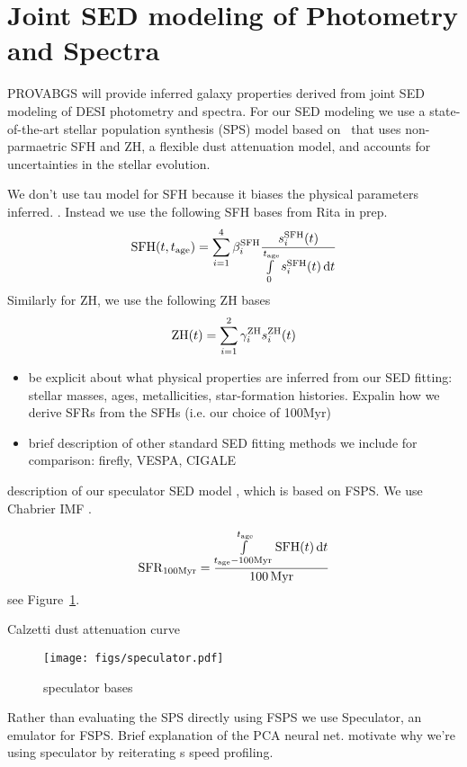 \section{Joint SED modeling of Photometry and Spectra} \label{sec:methods}
PROVABGS will provide inferred galaxy properties derived from joint SED
modeling of DESI photometry and spectra. 
For our SED modeling we use a state-of-the-art stellar population synthesis
(SPS) model based on \fsps~that uses non-parmaetric SFH and ZH, a flexible dust
attenuation model, and accounts for uncertainties in the stellar evolution. 

We don't use tau model for SFH because it biases the physical parameters
inferred. . Instead we use the
following SFH bases from Rita in prep. 
\begin{equation}
    {\rm SFH}(t, t_{\rm age}) = \sum\limits_{i=1}^{4} \beta_i^{\rm SFH}
    \frac{s_i^{\rm SFH}(t)}{\int\limits_0^{t_{\rm age}} s_i^{\rm SFH}(t) \,
    {\rm d}t}
\end{equation} 
Similarly for ZH, we use the following ZH bases 
\begin{equation}
    {\rm ZH}(t) = \sum\limits_{i=1}^2 \gamma_i^{\rm ZH} s_i^{\rm ZH}(t)
\end{equation} 



\begin{itemize}
    \item be explicit about what physical properties are inferred from our SED
        fitting: stellar masses, ages, metallicities, star-formation histories.
        Expalin how we derive SFRs from the SFHs (i.e. our choice of 100Myr) 
    \item brief description of other standard SED fitting methods we include for
        comparison: firefly, VESPA, CIGALE
\end{itemize} 


description of our speculator SED model \citep{alsing2019}, which is based on
FSPS. We use Chabrier IMF . 

\begin{equation}
    {\rm SFR}_{100{\rm Myr}} = \frac{\int\limits_{t_{\rm age} - 100{\rm
    Myr}}^{t_{\rm age}}{\rm SFH}(t)\,{\rm d}t}{100\,{\rm Myr}}
\end{equation} 
see Figure~\ref{fig:speculator}. 

Calzetti dust attenuation curve

\begin{figure}
\begin{center}
\texttt{[image: figs/speculator.pdf]} 
\caption{speculator bases}
\label{fig:speculator}
\end{center}
\end{figure}
Rather than evaluating the SPS directly using FSPS we use {\sc Speculator}, an
emulator for FSPS. Brief explanation of the PCA neural net. motivate why we're
using speculator by reiterating \cite{alsing2019}s speed profiling. 

